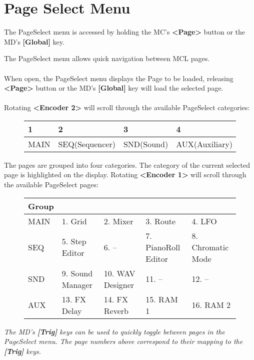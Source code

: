 \chapter{Page Select Menu}
The PageSelect menu is accessed by holding the MC's \textbf{<Page>} button or the MD's \textbf{[Global]} key.

The PageSelect menu allows quick navigation between MCL pages.
\\
\\
When open, the PageSelect menu displays the Page to be loaded, releasing \textbf{<Page>} button or the MD's \textbf{[Global]} key will load the selected page.
\\
\\
Rotating \textbf{<Encoder 2>} will scroll through the available PageSelect categories:

\begin{figure}[h]
    \begin{tabular}{|l|l|l|l|}
    \hline
    \rowcolor[HTML]{C0C0C0} 
    1    & 2              & 3          & 4              \\ \hline
    MAIN & SEQ(Sequencer) & SND(Sound) & AUX(Auxiliary) \\ \hline
    \end{tabular}
\end{figure}

The pages are grouped into four categories. The category of the current selected page is highlighted on the display.
Rotating \textbf{<Encoder 1>} will scroll through the available PageSelect pages:

\begin{figure}[h]
    \begin{tabular}{|l|l|l|l|l|}
    \hline
    \rowcolor[HTML]{C0C0C0} 
    {\color[HTML]{000000} Group} & \multicolumn{4}{l|}{\cellcolor[HTML]{C0C0C0}{\color[HTML]{000000} Pages}}      \\ \hline
    MAIN                              & 1. Grid            & 2. Mixer         & 3. Route           & 4. LFO            \\ \hline
    SEQ                               & 5. Step Editor & 6. -- & 7. PianoRoll Editor & 8. Chromatic Mode \\ \hline
    SND                               & 9. Sound Manager   & 10. WAV Designer & 11. --       & 12. --      \\ \hline
    AUX                               & 13. FX Delay       & 14. FX Reverb    & 15. RAM 1          & 16. RAM 2         \\ \hline
    \end{tabular}
\end{figure}

\textit{The MD's \textbf{[Trig]} keys can be used to quickly toggle between pages in the PageSelect menu. The page numbers above correspond to their mapping to the \textbf{[Trig]} keys. }






